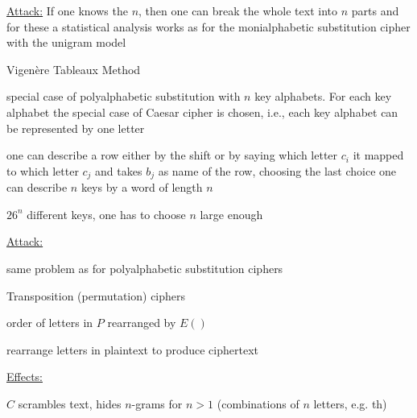 \documentclass[landscape, a4paper]{article}
\begin{document}
\begin{minipage}[t]{0.19\pagewidth}
\begin{betterlist}
\begin{betterlist}
\begin{betterlist}
				\item \underline{Attack:} If one knows the $n$, then one can break the whole text into $n$ parts and for these a statistical analysis works as for the monialphabetic substitution cipher with the unigram model
			\end{betterlist}
			\begin{betterlist}
				\item \alert{Vigenère Tableaux Method}
				\begin{betterlist}
					\item special case of polyalphabetic substitution with $n$ key alphabets. For each key alphabet the special case of Caesar cipher is chosen, i.e., each key alphabet can be represented by one letter
					\begin{betterlist}
						\item one can describe a row either by the shift or by saying which letter $c_i$ it mapped to which letter $c_j$ and takes $b_j$ as name of the row, choosing the last choice one can describe $n$ keys by a word of length $n$
					\end{betterlist}
					\item $26^n$ different keys, one has to choose $n$ large enough
					\item \underline{Attack:}
					\begin{betterlist}
						\item same problem as for polyalphabetic substitution ciphers
					\end{betterlist}
				\end{betterlist}
			\end{betterlist}
		\end{betterlist}
	\end{betterlist}
	\begin{betterlist}
		\item \alert{Transposition (permutation) ciphers}
		\begin{betterlist}
			\item order of letters in $P$ rearranged by $E()$
			\begin{betterlist}
				\item rearrange letters in plaintext to produce ciphertext
			\end{betterlist}
			\item \underline{Effects:}
			\begin{betterlist}
				\item $C$ scrambles text, hides $n$-grams for $n > 1$ (combinations of $n$ letters, e.g. th)

\end{betterlist}
\end{betterlist}
\end{betterlist}
\end{minipage}
\end{document}
